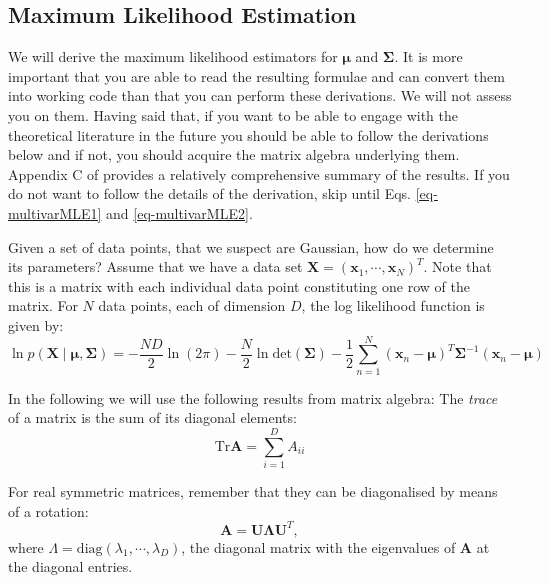   
  
  
  
  \subsection{Maximum Likelihood Estimation}
  We will derive the maximum likelihood estimators for $\boldsymbol{\mu}$ and $\boldsymbol{\Sigma}$. It is more important that you are able to read the resulting formulae and can
  convert them into working code than that you can perform these derivations. We will not assess  you on them. Having said that, if you want to be able to engage with the
  theoretical literature in the future you should be able to follow the derivations below and if not, you should acquire the matrix algebra underlying them.
  Appendix C of \cite{bishop2006} provides a relatively comprehensive summary of the results.
  If you do not want to follow the details of the derivation, skip until Eqs. \ref{eq-multivarMLE1} and \ref{eq-multivarMLE2}.
  
  Given a set of data points, that we suspect are Gaussian, how do we determine its parameters? Assume that we have a data set $\boldsymbol{X} = (\boldsymbol{x}_1, \cdots, \boldsymbol{x}_N)^T$.
  Note that this is a matrix with each individual data point constituting one row of the matrix. For $N$ data points, each of dimension $D$,
  the log likelihood function is given
  by:
  \begin{equation}
    \ln p(\boldsymbol{X} \mid \boldsymbol{\mu, \Sigma}) = -\frac{ND}{2} \ln (2\pi) - \frac{N}{2} \ln \mbox{det}(\boldsymbol{\Sigma}) -\frac{1}{2} \sum^N_{n=1}(\boldsymbol{x}_n - \boldsymbol{\mu})^T
        \boldsymbol{\Sigma}^{-1}(\boldsymbol{x}_n - \boldsymbol{\mu})
      \label{eq-mlgauss}
  \end{equation}

  In the following we will use the following results from matrix algebra:
  The \emph{trace} of a matrix is the sum of its diagonal elements:
  \begin{equation}
    \mbox{Tr}{\boldsymbol{A}} = \sum^D_{i=1} A_{ii}
  \end{equation}

  For real symmetric matrices, remember that they can be diagonalised by means of a rotation:
  \begin{equation}
    \boldsymbol{A} = \boldsymbol{U} \boldsymbol{\Lambda} \boldsymbol{U}^T,
    \label{eq-diag}
  \end{equation}
  where $\Lambda = \mbox{diag}(\lambda_1, \cdots, \lambda_D)$, the diagonal matrix with the eigenvalues of $\boldsymbol{A}$ at the
  diagonal entries.

